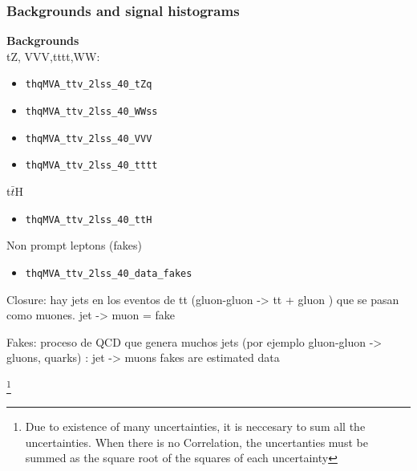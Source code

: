 \documentclass[11pt]{beamer}
\begin{document}
\begin{frame}
\frametitle{Backgrounds and signal histograms}
\textbf{Backgrounds} \\
tZ, VVV,tttt,WW:
\begin{itemize}
	\item \begin{alltt}thqMVA\_ttv\_2lss\_40\_tZq\end{alltt}
	\item \begin{alltt} thqMVA\_ttv\_2lss\_40\_WWss \end{alltt}
	\item \begin{alltt}thqMVA\_ttv\_2lss\_40\_VVV\end{alltt}
	\item \begin{alltt}thqMVA\_ttv\_2lss\_40\_tttt\end{alltt}
\end{itemize}
t$\bar{t}$H 
\begin{itemize}
	\item\begin{alltt} thqMVA\_ttv\_2lss\_40\_ttH\end{alltt}
\end{itemize}
Non prompt leptons (fakes)
\begin{itemize}
	\item\begin{alltt} thqMVA\_ttv\_2lss\_40\_data\_fakes\end{alltt}
\end{itemize} 
\end{frame}

\begin{frame}

Closure:  hay jets en los eventos de tt  (gluon-gluon -> tt + gluon ) que se pasan como muones.  jet -> muon =  fake

Fakes:   proceso de QCD  que genera muchos  jets (por ejemplo  gluon-gluon -> gluons, quarks)  :    jet -> muons  
fakes are estimated data 


\footnote[1]{Due to existence of many uncertainties, it is neccesary to sum all the uncertainties. When there is no Correlation, the uncertanties must be summed as the square root of the squares of each uncertainty}
\end{frame}
\end{document}
